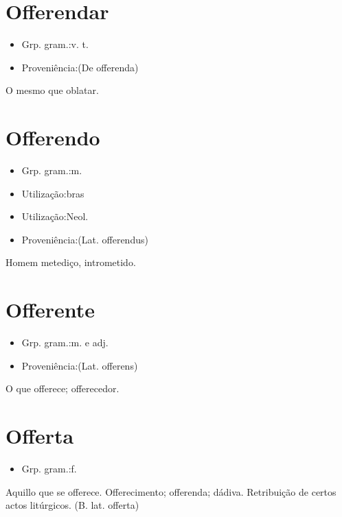\section{Offerendar}
\begin{itemize}
\item {Grp. gram.:v. t.}
\end{itemize}
\begin{itemize}
\item {Proveniência:(De \textunderscore offerenda\textunderscore )}
\end{itemize}
O mesmo que \textunderscore oblatar\textunderscore .
\section{Offerendo}
\begin{itemize}
\item {Grp. gram.:m.}
\end{itemize}
\begin{itemize}
\item {Utilização:bras}
\end{itemize}
\begin{itemize}
\item {Utilização:Neol.}
\end{itemize}
\begin{itemize}
\item {Proveniência:(Lat. \textunderscore offerendus\textunderscore )}
\end{itemize}
Homem metediço, intrometido.
\section{Offerente}
\begin{itemize}
\item {Grp. gram.:m.  e  adj.}
\end{itemize}
\begin{itemize}
\item {Proveniência:(Lat. \textunderscore offerens\textunderscore )}
\end{itemize}
O que offerece; offerecedor.
\section{Offerta}
\begin{itemize}
\item {Grp. gram.:f.}
\end{itemize}
Aquillo que se offerece.
Offerecimento; offerenda; dádiva.
Retribuição de certos actos litúrgicos.
(B. lat. \textunderscore offerta\textunderscore )
